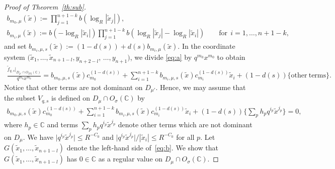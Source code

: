\documentclass[10pt,a4paper]{amsart}
\numberwithin{equation}{section}
\begin{document}
\begin{proof}[Proof of Theorem~\ref{th:sub}]
\begin{gather*}
b_{m_0,\mu}(\tilde{x}) :=\prod_{j=1}^{n+1-k}b(\log_R|\tilde{x}_j|),\\
b_{m_i,\mu}(\tilde{x}) :=b(-\log_R|\tilde{x}_i|) \prod_{j=1}^{n+1-k}b(\log_R|\tilde{x}_j|-\log_R|\tilde{x}_i|)\qquad \mathrm{for} \ \ i=1, \dots, n+1-k,
\end{gather*}
and set $b_{m_i,\mu,s}(\tilde{x}) := (1-d(s))+d(s) b_{m_i,\mu}(\tilde{x})$.
In the coordinate system $(\tilde{x}_1, \dots, \tilde{x}_{n+1-l}, y_{n+2-l}$, $\dots, y_{n+1})$, we divide \eqref{eq:a} by $q^{m_0}x^{m_0}$ to obtain
\begin{gather*}%
\frac{\tilde{f}_{q,s} \big|_{D_{\mu'} \cap O_{\{0\}}({\mathbb C})} }{q^{m_0}x^{m_0}}=
b_{m_0,\mu,s}(\tilde{x})c_{m_0}^{(1-d(s))}\!+\!\sum_{i=1}^{n+1-k} \!\!b_{m_i,\mu,s}(\tilde{x})c_{m_i}^{(1-d(s))}\tilde{x}_i
+(1-d(s))\{ \mathrm{other\ terms} \}.
\end{gather*}
Notice that other terms are not dominant on $D_{\mu'}$. Hence, we may assume that the subset $V_{q,s}$ is def\/ined on $D_\mu \cap O_\sigma({\mathbb C})$ by
\begin{gather}\label{eq:b}
b_{m_0,\mu,s}(\tilde{x})c_{m_0}^{(1-d(s))}+\sum_{i=1}^{n+1-k} b_{m_i,\mu,s}(\tilde{x})c_{m_i}^{(1-d(s))}\tilde{x}_i
+(1-d(s))\bigg\{ \sum_{p} h_p q^{i_p}\tilde{x}^{j_p} \bigg\}=0,
\end{gather}
where $h_p \in {\mathbb C}$ and terms $\sum_{p} h_p q^{i_p}\tilde{x}^{j_p}$ denote other terms which are not dominant on $D_\mu$. We have $\big|q^{i_p}\tilde{x}^{j_p}\big| \leq R^{-C_0}$ and $\big|q^{i_p}\tilde{x}^{j_p}\big|/|\tilde{x}_{i}| \leq R^{-C_0}$ for all $p$. Let $G(\tilde{x}_1, \dots, \tilde{x}_{n+1-l})$ denote the left-hand side of~\eqref{eq:b}. We show that $G(\tilde{x}_1, \dots, \tilde{x}_{n+1-l})$ has $0 \in {\mathbb C}$ as a regular value on $D_\mu \cap O_\sigma({\mathbb C})$.


\end{proof}
\end{document}
